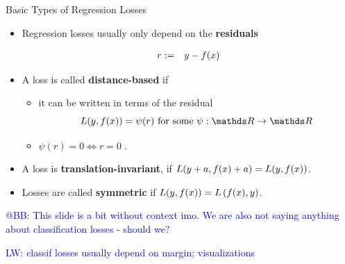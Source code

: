 \begin{vbframe}{Basic Types of Regression Losses}


\begin{itemize}
  \item Regression losses usually only depend on the \textbf{ residuals}

  \vspace*{-0.5cm}

  \begin{eqnarray*}
    r &:=& y - \fx %
  \end{eqnarray*}

  \item A loss is called \textbf{distance-based} if
  \begin{itemize}
    \item it can be written in terms of the residual
    $$
      \Lxy = \psi (r) \text{ for some } \psi: \R \to \R
    $$
    \item $\psi(r) = 0 \Leftrightarrow r = 0$ .
  \end{itemize}
  \item A loss is \textbf{translation-invariant}, if $L(y + a, f(x) + a) = L(y, f(x))$.
  \item Losses are called \textbf{symmetric} if $L(y, f(x)) = L\left(f(x), y\right)$. 
\end{itemize}

  \textcolor{blue}{@BB: This slide is a bit without context imo. We are also not saying anything about classification losses - should we? }


\textcolor{blue}{LW: classif losses usually depend on margin; visualizations}

\end{vbframe}

